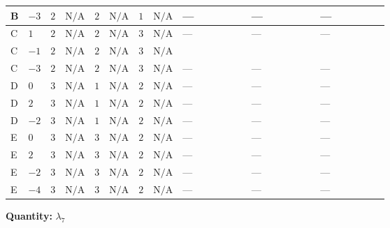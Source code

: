 \documentclass[8pt]{article}
\begin{document}
\begin{landscape}
\begin{longtable}{@{}llcccccc >{\raggedright\arraybackslash}p{0.21\linewidth} >{\raggedright\arraybackslash}p{0.21\linewidth} >{\raggedright\arraybackslash}p{0.21\linewidth}@{}}
\midrule
B & $-3$ & $2$ & $\text{N/A}$ & $2$ & $\text{N/A}$ & $1$ & $\text{N/A}$ & --- & --- & --- \\
\midrule
C & $1$ & $2$ & $\text{N/A}$ & $2$ & $\text{N/A}$ & $3$ & $\text{N/A}$ & --- & --- & --- \\
\midrule
C & $-1$ & $2$ & $\text{N/A}$ & $2$ & $\text{N/A}$ & $3$ & $\text{N/A}$ & \scriptsize\adjustbox{max width=\linewidth}{$\begin{gathered} +2 {\lambda_1} {\lambda_{7}}\end{gathered}$} & \scriptsize\adjustbox{max width=\linewidth}{$\begin{gathered} +8 {\lambda_{HS_1}^{(1)}} {\lambda_{7}}\end{gathered}$} & \scriptsize\adjustbox{max width=\linewidth}{$\begin{gathered} -4 {\lambda_{HS_1}^{(A)}} {\lambda_{7}}\end{gathered}$} \\
\midrule
C & $-3$ & $2$ & $\text{N/A}$ & $2$ & $\text{N/A}$ & $3$ & $\text{N/A}$ & --- & --- & --- \\
\midrule
D & $0$ & $3$ & $\text{N/A}$ & $1$ & $\text{N/A}$ & $2$ & $\text{N/A}$ & --- & --- & --- \\
\midrule
D & $2$ & $3$ & $\text{N/A}$ & $1$ & $\text{N/A}$ & $2$ & $\text{N/A}$ & --- & --- & --- \\
\midrule
D & $-2$ & $3$ & $\text{N/A}$ & $1$ & $\text{N/A}$ & $2$ & $\text{N/A}$ & --- & --- & --- \\
\midrule
E & $0$ & $3$ & $\text{N/A}$ & $3$ & $\text{N/A}$ & $2$ & $\text{N/A}$ & --- & --- & --- \\
\midrule
E & $2$ & $3$ & $\text{N/A}$ & $3$ & $\text{N/A}$ & $2$ & $\text{N/A}$ & --- & --- & --- \\
\midrule
E & $-2$ & $3$ & $\text{N/A}$ & $3$ & $\text{N/A}$ & $2$ & $\text{N/A}$ & --- & --- & --- \\
\midrule
E & $-4$ & $3$ & $\text{N/A}$ & $3$ & $\text{N/A}$ & $2$ & $\text{N/A}$ & --- & --- & --- \\
\midrule
\bottomrule
\end{longtable}
\clearpage
\noindent\textbf{Quantity: }$\lambda_{7}$\par\smallskip

\end{landscape}
\end{document}
